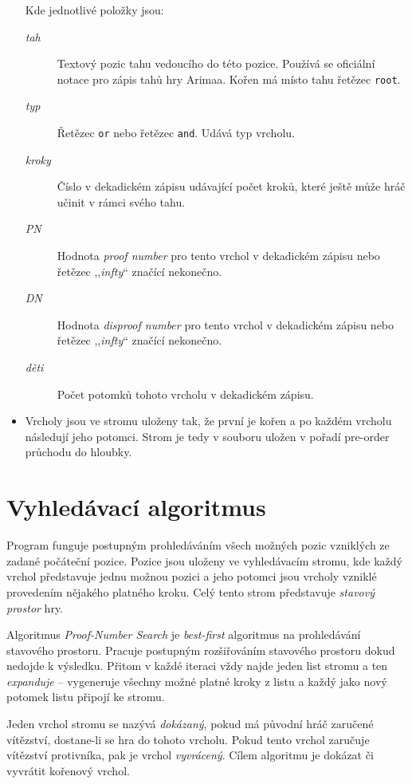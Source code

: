 \documentclass{article}
\begin{document}
\begin{itemize}
  Kde jednotlivé položky jsou:\begin{description}
	  \item[\textit{tah}] Textový pozic tahu vedoucího do této pozice. Používá se oficiální notace pro zápis tahů hry
	  Arimaa. Kořen má místo tahu řetězec \texttt{root}.
	  \item[\textit{typ}] Řetězec \texttt{or} nebo řetězec \texttt{and}. Udává typ vrcholu.
	  \item[\textit{kroky}] Číslo v dekadickém zápisu udávající počet kroků, které ještě může hráč učinit v rámci svého
	  tahu.
	  \item[\textit{PN}] Hodnota \emph{proof number} pro tento vrchol v dekadickém zápisu nebo řetězec ,,\textit{infty}``
	  značící nekonečno.
	  \item[\textit{DN}] Hodnota \emph{disproof number} pro tento vrchol v dekadickém zápisu nebo řetězec ,,\textit{infty}``
	  značící nekonečno.
	  \item[\textit{děti}] Počet potomků tohoto vrcholu v dekadickém zápisu.
  \end{description}
  \item Vrcholy jsou ve stromu uloženy tak, že první je kořen a po každém vrcholu následují jeho potomci. Strom je tedy
  v souboru uložen v pořadí pre-order průchodu do hloubky.
\end{itemize}

\section{Vyhledávací algoritmus}
Program funguje postupným prohledáváním všech možných pozic vzniklých ze zadané počáteční pozice. Pozice jsou uloženy ve
vyhledávacím stromu, kde každý vrchol představuje jednu možnou pozici a jeho potomci jsou vrcholy vzniklé provedením
nějakého platného kroku. Celý tento strom představuje \emph{stavový prostor} hry.

Algoritmus \emph{Proof-Number Search} je \emph{best-first} algoritmus na prohledávání stavového prostoru. Pracuje
postupným rozšiřováním stavového prostoru dokud nedojde k výsledku. Přitom v každé iteraci vždy najde jeden list stromu
a ten \emph{expanduje} -- vygeneruje všechny možné platné kroky z listu a každý jako nový potomek listu připojí ke
stromu.

Jeden vrchol stromu se nazývá \emph{dokázaný}, pokud má původní hráč zaručené vítězství, dostane-li se hra do tohoto
vrcholu. Pokud tento vrchol zaručuje vítězství protivníka, pak je vrchol \emph{vyvrácený}. Cílem algoritmu je dokázat či
vyvrátit kořenový vrchol.
\end{document}
